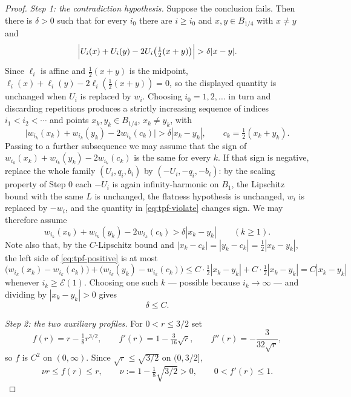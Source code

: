 \begin{proof}
\emph{Step 1: the contradiction hypothesis.}
Suppose the conclusion fails. Then there is $\delta>0$ such that for every
$i_0$ there are $i\ge i_0$ and $x,y\in B_{1/4}$ with $x\ne y$ and
\[
  \Bigl|U_i(x)+U_i(y)-2U_i\bigl(\tfrac12(x+y)\bigr)\Bigr|>\delta|x-y| .
\]
Since $\ell_i$ is affine and $\tfrac12(x+y)$ is the midpoint,
$\ell_i(x)+\ell_i(y)-2\ell_i(\tfrac12(x+y))=0$, so the displayed quantity is
unchanged when $U_i$ is replaced by $w_i$. Choosing $i_0=1,2,\dots$ in turn and
discarding repetitions produces a strictly increasing sequence of indices
$i_1<i_2<\cdots$ and points $x_k,y_k\in B_{1/4}$, $x_k\ne y_k$, with
\begin{equation}\label{eq:tpf-violate}
  \bigl|w_{i_k}(x_k)+w_{i_k}(y_k)-2w_{i_k}(c_k)\bigr|>\delta|x_k-y_k|,
  \qquad c_k=\tfrac12(x_k+y_k).
\end{equation}
Passing to a further subsequence we may assume that the sign of
$w_{i_k}(x_k)+w_{i_k}(y_k)-2w_{i_k}(c_k)$ is the same for every $k$. If that
sign is negative, replace the whole family $(U_i,q_i,b_i)$ by
$(-U_i,-q_i,-b_i)$: by the scaling property of Step 0 each $-U_i$ is again
infinity-harmonic on $B_1$, the Lipschitz bound with the same $L$ is unchanged,
the flatness hypothesis is unchanged, $w_i$ is replaced by $-w_i$, and the
quantity in \eqref{eq:tpf-violate} changes sign. We may therefore assume
\begin{equation}\label{eq:tpf-positive}
  w_{i_k}(x_k)+w_{i_k}(y_k)-2w_{i_k}(c_k)>\delta|x_k-y_k|\qquad(k\ge1).
\end{equation}
Note also that, by the $C$-Lipschitz bound and $|x_k-c_k|=|y_k-c_k|=\tfrac12
|x_k-y_k|$, the left side of \eqref{eq:tpf-positive} is at most
\[
  \bigl(w_{i_k}(x_k)-w_{i_k}(c_k)\bigr)+\bigl(w_{i_k}(y_k)-w_{i_k}(c_k)\bigr)
   \le C\cdot\tfrac12|x_k-y_k|+C\cdot\tfrac12|x_k-y_k|=C|x_k-y_k|
\]
whenever $i_k\ge\mathcal E(1)$. Choosing one such $k$ --- possible because
$i_k\to\infty$ --- and dividing by $|x_k-y_k|>0$ gives
\begin{equation}\label{eq:tpf-deltaC}
  \delta\le C .
\end{equation}

\emph{Step 2: the two auxiliary profiles.}
For $0<r\le3/2$ set
\[
  f(r)=r-\tfrac18r^{3/2},\qquad
  f'(r)=1-\tfrac3{16}\sqrt r,\qquad
  f''(r)=-\frac3{32\sqrt r},
\]
so $f$ is $C^2$ on $(0,\infty)$. Since $\sqrt r\le\sqrt{3/2}$ on $(0,3/2]$,
\begin{equation}\label{eq:tpf-f}
  \nu r\le f(r)\le r,\qquad \nu:=1-\tfrac18\sqrt{3/2}>0,
  \qquad 0<f'(r)\le1 .
\end{equation}


\end{proof}
